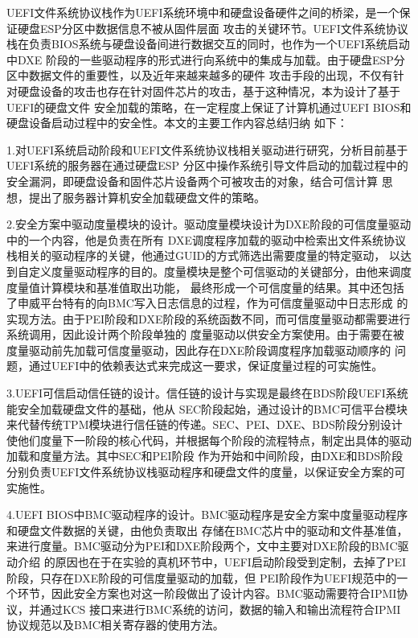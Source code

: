 \begin{APP}
UEFI文件系统协议栈作为UEFI系统环境中和硬盘设备硬件之间的桥梁，是一个保证硬盘ESP分区中数据信息不被从固件层面
攻击的关键环节。UEFI文件系统协议栈在负责BIOS系统与硬盘设备间进行数据交互的同时，也作为一个UEFI系统启动中DXE
阶段的一些驱动程序的形式进行向系统中的集成与加载。由于硬盘ESP分区中数据文件的重要性，以及近年来越来越多的硬件
攻击手段的出现，不仅有针对硬盘设备的攻击也存在针对固件芯片的攻击，基于这种情况，本为设计了基于UEFI的硬盘文件
安全加载的策略，在一定程度上保证了计算机通过UEFI BIOS和硬盘设备启动过程中的安全性。本文的主要工作内容总结归纳
如下：
\par 1.对UEFI系统启动阶段和UEFI文件系统协议栈相关驱动进行研究，分析目前基于UEFI系统的服务器在通过硬盘ESP
分区中操作系统引导文件启动的加载过程中的安全漏洞，即硬盘设备和固件芯片设备两个可被攻击的对象，结合可信计算
思想，提出了服务器计算机安全加载硬盘文件的策略。
\par 2.安全方案中驱动度量模块的设计。驱动度量模块设计为DXE阶段的可信度量驱动中的一个内容，他是负责在所有
DXE调度程序加载的驱动中检索出文件系统协议栈相关的驱动程序的关键，他通过GUID的方式筛选出需要度量的特定驱动，
以达到自定义度量驱动程序的目的。度量模块是整个可信驱动的关键部分，由他来调度度量值计算模块和基准值取出功能，
最终形成一个可信度量的结果。其中还包括了申威平台特有的向BMC写入日志信息的过程，作为可信度量驱动中日志形成
的实现方法。由于PEI阶段和DXE阶段的系统函数不同，而可信度量驱动都需要进行系统调用，因此设计两个阶段单独的
度量驱动以供安全方案使用。由于需要在被度量驱动前先加载可信度量驱动，因此存在DXE阶段调度程序加载驱动顺序的
问题，通过UEFI中的依赖表达式来完成这一要求，保证度量过程的可实施性。
\par 3.UEFI可信启动信任链的设计。信任链的设计与实现是最终在BDS阶段UEFI系统能安全加载硬盘文件的基础，他从
SEC阶段起始，通过设计的BMC可信平台模块来代替传统TPM模块进行信任链的传递。SEC、PEI、DXE、BDS阶段分别设计
使他们度量下一阶段的核心代码，并根据每个阶段的流程特点，制定出具体的驱动加载和度量方法。其中SEC和PEI阶段
作为开始和中间阶段，由DXE和BDS阶段分别负责UEFI文件系统协议栈驱动程序和硬盘文件的度量，以保证安全方案的可
实施性。
\par 4.UEFI BIOS中BMC驱动程序的设计。BMC驱动程序是安全方案中度量驱动程序和硬盘文件数据的关键，由他负责取出
存储在BMC芯片中的驱动和文件基准值，来进行度量。BMC驱动分为PEI和DXE阶段两个，文中主要对DXE阶段的BMC驱动介绍
的原因也在于在实验的真机环节中，UEFI启动阶段受到定制，去掉了PEI阶段，只存在DXE阶段的可信度量驱动的加载，但
PEI阶段作为UEFI规范中的一个环节，因此安全方案也对这一阶段做出了设计内容。BMC驱动需要符合IPMI协议，并通过KCS
接口来进行BMC系统的访问，数据的输入和输出流程符合IPMI协议规范以及BMC相关寄存器的使用方法。

\end{APP}
